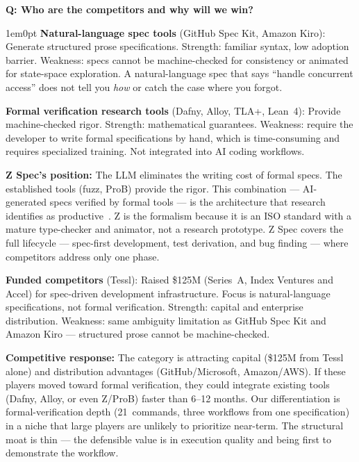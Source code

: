 \documentclass[11pt,letterpaper]{article}
\newcounter{faqnum}
\newenvironment{faqpair}[1]{%
  \needspace{4\baselineskip}%
  \vspace{0.5em}%
  \refstepcounter{faqnum}%
  \noindent\textbf{\color{SectionBlue}Q\thefaqnum: #1}\par\nopagebreak[4]%
  \vspace{0.2em}%
  \begin{adjustwidth}{1em}{0pt}%
  \setlength{\parindent}{0pt}%
}{%
  \end{adjustwidth}%
  \vspace{0.5em}%
}
\begin{document}
\begin{faqpair}{Who are the competitors and why will we win?}\label{faq:competitors}
\textbf{Natural-language spec tools} (GitHub Spec Kit, Amazon Kiro): Generate structured prose specifications. Strength: familiar syntax, low adoption barrier. Weakness: specs cannot be machine-checked for consistency or animated for state-space exploration. A natural-language spec that says ``handle concurrent access'' does not tell you \emph{how} or catch the case where you forgot.

\textbf{Formal verification research tools} (Dafny, Alloy, TLA+, Lean~4): Provide machine-checked rigor. Strength: mathematical guarantees. Weakness: require the developer to write formal specifications by hand, which is time-consuming and requires specialized training. Not integrated into AI coding workflows.

\textbf{Z Spec's position:} The LLM eliminates the writing cost of formal specs. The established tools (fuzz, ProB) provide the rigor. This combination --- AI-generated specs verified by formal tools --- is the architecture that research identifies as productive~\cite{councilman2025astrogator,faria2026dafny,kleppmann2025fvmainstream}. Z is the formalism because it is an ISO standard with a mature type-checker and animator, not a research prototype. Z Spec covers the full lifecycle --- spec-first development, test derivation, and bug finding --- where competitors address only one phase.

\textbf{Funded competitors} (Tessl): Raised \$125M (Series~A, Index Ventures and Accel) for spec-driven development infrastructure. Focus is natural-language specifications, not formal verification. Strength: capital and enterprise distribution. Weakness: same ambiguity limitation as GitHub Spec Kit and Amazon Kiro --- structured prose cannot be machine-checked.

\textbf{Competitive response:} The category is attracting capital (\$125M from Tessl alone) and distribution advantages (GitHub/Microsoft, Amazon/AWS). If these players moved toward formal verification, they could integrate existing tools (Dafny, Alloy, or even Z/ProB) faster than 6--12 months. Our differentiation is formal-verification depth (21~commands, three workflows from one specification) in a niche that large players are unlikely to prioritize near-term. The structural moat is thin --- the defensible value is in execution quality and being first to demonstrate the workflow.
\end{faqpair}
\end{document}
